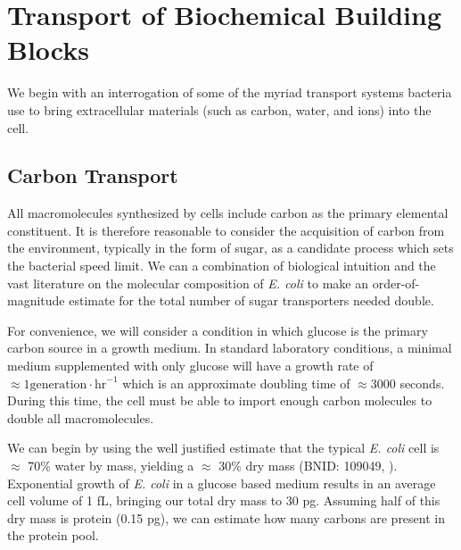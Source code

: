 \section{Transport of Biochemical Building Blocks}
We begin with an interrogation of some of the myriad transport systems bacteria
use to bring extracellular materials (such as carbon, water, and ions) into the
cell. 

\subsection{Carbon Transport}
All macromolecules synthesized by cells include carbon as the primary elemental 
constituent. It is therefore reasonable to consider the acquisition of carbon
from the environment, typically in the form of sugar, as a candidate process 
which sets the bacterial speed limit. We can a combination of biological intuition
and the vast literature on the molecular composition of \textit{E. coli} to make 
an order-of-magnitude estimate for the total number of sugar transporters needed 
double. 

For convenience, we will consider a condition in which glucose is the primary
carbon source in a growth medium. In standard laboratory conditions, a
minimal medium supplemented with only glucose will have a growth rate of
$\approx 1 \text{generation}\cdot\text{hr}^{-1}$ which is an approximate
doubling time of $\approx 3000 $ seconds. During this time, the cell must be
able to import enough carbon molecules to double all macromolecules.  

We can begin by using the well justified estimate that the typical \textit{E. coli}
cell is $\approx$ 70\% water by mass, yielding a $\approx$ 30\% dry mass (BNID: 109049, \cite{milo2010}).
Exponential growth of \textit{E. coli} in a glucose based medium results in an 
average cell volume of 1 fL, bringing our total dry mass to 30 pg. Assuming half of 
this dry mass is protein (0.15 pg), we can estimate how many carbons are present in 
the protein pool.   

